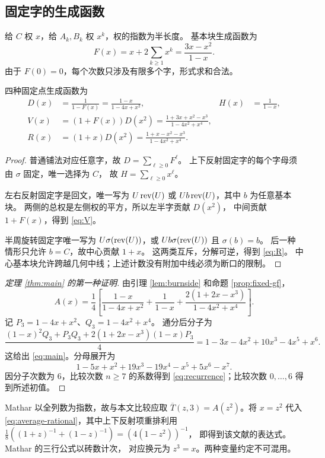 \subsection{固定字的生成函数}
给 $C$ 权 $x$，给 $A_k,B_k$ 权 $x^k$，权的指数为半长度。
基本块生成函数为
\begin{equation}\label{eq:F}
 F(x)=x+2\sum_{k\ge1}x^k=\frac{3x-x^2}{1-x}.
\end{equation}
由于 $F(0)=0$，每个次数只涉及有限多个字，形式求和合法。

\begin{proposition}\label{prop:fixed-gf}
四种固定点生成函数为
\begin{align}
D(x)&=\frac{1}{1-F(x)}=\frac{1-x}{1-4x+x^2},&
H(x)&=\frac{1}{1-x},\label{eq:DH}\\
V(x)&=(1+F(x))D(x^2)
 =\frac{1+3x+x^2-x^3}{1-4x^2+x^4},\label{eq:V}\\
R(x)&=(1+x)D(x^2)
 =\frac{1+x-x^2-x^3}{1-4x^2+x^4}.\label{eq:R}
\end{align}
\end{proposition}
\begin{proof}
普通铺法对应任意字，故 $D=\sum_{\ell\ge0}F^\ell$。
上下反射固定字的每个字母须由 $\sigma$ 固定，唯一选择为 $C$，
故 $H=\sum_{\ell\ge0}x^\ell$。

左右反射固定字是回文，唯一写为
$U\operatorname{rev}(U)$ 或 $Ub\operatorname{rev}(U)$，其中 $b$ 为任意基本块。
两侧的总权是左侧权的平方，所以左半字贡献 $D(x^2)$，
中间贡献 $1+F(x)$，得到 \eqref{eq:V}。

半周旋转固定字唯一写为
$U\sigma(\operatorname{rev}(U))$，或 $Ub\sigma(\operatorname{rev}(U))$ 且 $\sigma(b)=b$。
后一种情形只允许 $b=C$，故中心贡献 $1+x$。
这两类互斥，分解可逆，得到 \eqref{eq:R}。
中心基本块允许跨越几何中线；上述计数没有附加中线必须为断口的限制。
\end{proof}

\begin{proof}[定理 \ref{thm:main} 的第一种证明]
由引理 \ref{lem:burnside} 和命题 \ref{prop:fixed-gf}，
\begin{equation}\label{eq:average-rational}
 A(x)=\frac14\left[
 \frac{1-x}{1-4x+x^2}+\frac1{1-x}
 +\frac{2(1+2x-x^3)}{1-4x^2+x^4}\right].
\end{equation}
记 $P_3=1-4x+x^2$、$Q_3=1-4x^2+x^4$。
通分后分子为
\[
 \frac{(1-x)^2Q_3+P_3Q_3+
 2(1+2x-x^3)(1-x)P_3}{4}
 =1-3x-4x^2+10x^3-4x^5+x^6.
\]
这给出 \eqref{eq:main}。分母展开为
\[
 1-5x+x^2+19x^3-19x^4-x^5+5x^6-x^7.
\]
因分子次数为 6，比较次数 $n\ge7$ 的系数得到
\eqref{eq:recurrence}；比较次数 $0,\ldots,6$ 得到所述初值。
\end{proof}

Mathar \cite[式 (26)]{mathar2013} 以全列数为指数，故与本文比较应取
$\overline T(z,3)=A(z^2)$。将 $x=z^2$ 代入
\eqref{eq:average-rational}，其中上下反射项重排利用
$\tfrac18((1+z)^{-1}+(1-z)^{-1})=(4(1-z^2))^{-1}$，
即得到该文献的表达式。
Mathar \cite[式 (4)--(6)]{mathar2014} 的三行公式以砖数计次，
对应换元为 $z^3=x$。两种变量约定不可混用。

